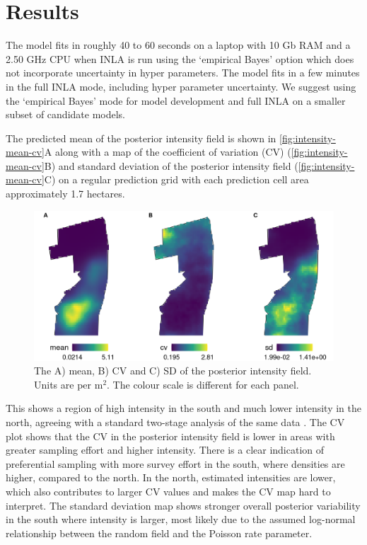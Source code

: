 \documentclass{statsoc}
\begin{document}
\section{Results}
\label{sec-results} 

The model fits in roughly 40 to 60 seconds on a laptop with 10 Gb RAM and a 2.50 GHz CPU when INLA is run using the `empirical Bayes' option which does not incorporate uncertainty in hyper parameters.  The model fits in a few minutes in the full INLA mode, including hyper parameter uncertainty.  We suggest using the `empirical Bayes' mode for model development and full INLA on a smaller subset of candidate models.  

The predicted mean of the posterior intensity field is shown in \autoref{fig:intensity-mean-cv}A along with a map of the coefficient of variation (CV) (\autoref{fig:intensity-mean-cv}B) and standard deviation of the posterior intensity field (\autoref{fig:intensity-mean-cv}C) on a regular prediction grid with each prediction cell area approximately 1.7 hectares.
\begin{figure}[!htb]
	\begin{center}
		\includegraphics[scale=0.525]{figures/intensity_mean_cv_sd.png}
		\caption{The A) mean, B) CV and C) SD of the posterior intensity field.  Units are per m$^2$.  The colour scale is different for each panel.}
		\label{fig:intensity-mean-cv}
	\end{center}
\end{figure}
This shows a region of high intensity in the south and much lower intensity in the north, agreeing with a standard two-stage analysis of the same data \citep{camp_dsm_2020}.  The CV plot shows that the CV in the posterior intensity field is lower in areas with greater sampling effort and higher intensity.  There is a clear indication of preferential sampling with more survey effort in the south, where densities are higher, compared to the north.  In the north, estimated intensities are lower, which also contributes to larger CV values and makes the CV map hard to interpret.  The standard deviation map shows stronger overall posterior variability in the south where intensity is larger, most likely due to the assumed log-normal relationship between the random field and the Poisson rate parameter.  
\end{document}
